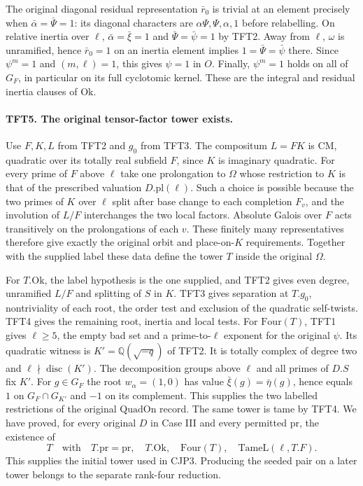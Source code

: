 The original diagonal residual representation $\bar r_0$ is trivial
at an element precisely when $\bar\alpha=\bar\Psi=1$: its diagonal
characters are $\alpha\Psi,\Psi,\alpha,1$ before relabelling.
On relative inertia over $\ell$, $\bar\alpha=\bar\xi=1$ and
$\bar\Psi=\bar\psi=1$ by TFT2. Away from $\ell$,
$\omega$ is unramified, hence $\bar r_0=1$ on an inertia element
implies $1=\bar\Psi=\bar\psi$ there. Since $\psi^m=1$ and
$(m,\ell)=1$, this gives $\psi=1$ in $O$. Finally, $\psi^m=1$
holds on all of $G_F$, in particular on its full cyclotomic kernel.
These are the integral and residual inertia clauses of $\mathrm{Ok}$.

\paragraph{TFT5. The original tensor-factor tower exists.}
Use $F,K,L$ from TFT2 and $g_0$ from TFT3. The compositum $L=FK$
is CM, quadratic over its totally real subfield $F$, since $K$
is imaginary quadratic. For every prime of $F$ above $\ell$ take
one prolongation to $\Omega$ whose restriction to $K$ is that of
the prescribed valuation $D.\mathrm{pl}(\ell)$. Such a choice is
possible because the two primes of $K$ over $\ell$ split after
base change to each completion $F_v$, and the involution of $L/F$
interchanges the two local factors. Absolute Galois over $F$ acts
transitively on the prolongations of each $v$. These finitely many
representatives therefore give exactly the original orbit and
place-on-$K$ requirements. Together with the supplied label these
data define the tower $T$ inside the original $\Omega$.

For $T.\mathrm{Ok}$, the label hypothesis is the one supplied, and
TFT2 gives even degree, unramified $L/F$ and splitting of $S$ in
$K$. TFT3 gives separation at $T.g_0$, nontriviality of each
root, the order test and exclusion of the quadratic self-twists.
TFT4 gives the remaining root, inertia and local tests.
For $\mathrm{Four}(T)$, TFT1 gives $\ell\ge5$, the empty bad set
and a prime-to-$\ell$ exponent for the original $\psi$.
Its quadratic witness is $K'=\mathbb Q(\sqrt{-q})$ of TFT2.
It is totally complex of degree two and $\ell\nmid\operatorname{disc}(K')$.
The decomposition groups above $\ell$ and all primes of $D.S$
fix $K'$. For $g\in G_F$ the root $w_\alpha=(1,0)$ has value
$\bar\xi(g)=\bar\eta(g)$, hence equals $1$ on $G_F\cap G_{K'}$
and $-1$ on its complement. This supplies the two labelled
restrictions of the original $\mathrm{QuadOn}$ record.
The same tower is tame by TFT4. We have proved, for every original
$D$ in Case III and every permitted $\mathrm{pr}$, the existence of
\[
 T\quad\text{with}\quad T.\mathrm{pr}=\mathrm{pr},\quad
 T.\mathrm{Ok},\quad \mathrm{Four}(T),\quad
 \mathrm{TameL}(\ell,T.F).
\]
This supplies the initial tower used in CJP3. Producing the seeded
pair on a later tower belongs to the separate rank-four reduction.
